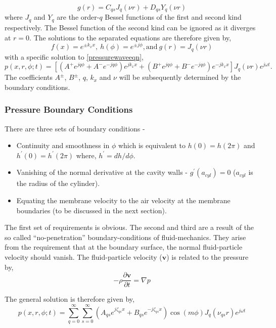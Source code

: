 \begin{equation}
 g(r)=C_{qs}J_q(\nu r)+D_{qs}Y_q(\nu r)
\end{equation}
where $J_q$ and $Y_q$ are the order-$q$ Bessel functions of the first and second kind respectively. The Bessel function of the second kind can be ignored as it diverges at $r=0$.
The solutions to the separated equations are therefore given by,
\begin{equation}
 f(x)=e^{\pm k_x x},\ h(\phi)=e^{\pm j\phi},\text{and}\ g(r)=J_q(\nu r)
\end{equation}
with a specific solution to \eqref{pressurewaveeqn},
\begin{equation}
 p(x,r,\phi;t)=\left[(A^+e^{jq\phi}+A^-e^{-jq\phi})e^{jk_xx}+(B^+e^{jq\phi}+B^-e^{-jq\phi})e^{-jk_xx}\right]J_q(\nu r)e^{j\omega t}.
\end{equation}
The coefficients $A^\pm$, $B^\pm$, $q$, $k_x$ and $\nu$ will be subsequently determined by the boundary conditions.
\subsubsection{Pressure Boundary Conditions}
There are three sets of boundary conditions - 
\begin{itemize}
 \item Continuity and smoothness in $\phi$ which is equivalent to $h(0)=h(2\pi)$ and $h^\prime(0)=h^\prime(2\pi)$ where, $h^\prime=dh/d\phi$.
 \item Vanishing of the normal derivative at the cavity walls - $g^\prime(a_{cyl})=0$ ($a_{cyl}$ is the radius of the cylinder).
 \item Equating the membrane velocity to the air velocity at the membrane boundaries (to be discussed in the next section).
\end{itemize}
The first set of requirements is obvious. The second and third are a result of the so called ``no-penetration'' boundary-conditions
of fluid-mechanics. They arise from the requirement that at the boundary surface, the normal fluid-particle velocity should vanish. The 
fluid-particle velocity ($\mathbf{v}$) is related to the pressure by, 
\begin{equation}\label{pressurevelocityrelation}
 -\rho\frac{\partial \mathbf{v}}{\partial t}=\nabla p
\end{equation}


The general solution is therefore given by,
\begin{equation}\label{pressuregeneral1}
 p(x,r,\phi;t)=\displaystyle\sum^\infty_{q=0}\displaystyle\sum^\infty_{s=0}\left(A_{qs}e^{j\zeta_{qs}x}+B_{qs}e^{-j\zeta_{qs}x}\right)\cos(m\phi)J_q(\nu_{qs}r)e^{j\omega t}
\end{equation}


